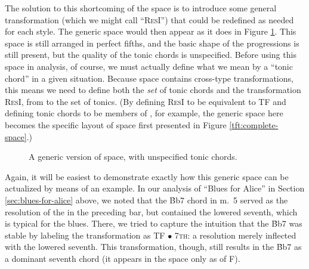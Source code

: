 The solution to this shortcoming of the space is to introduce some general
transformation (which we might call ``\textsc{ResI}'') that could be redefined
as needed for each style. The generic space would then appear as it
does in Figure \ref{tfe:generic-space}. This space is still arranged in
perfect fifths, and the basic shape of the \tfo progressions is still present,
but the quality of the tonic chords is unspecified. Before using this space in
analysis, of course, we must actually define what we mean by a ``tonic chord''
in a given situation. Because \tf space contains cross-type transformations,
this means we need to define both the \emph{set} of tonic chords and the
transformation \textsc{ResI}, from \Sdom to the set of tonics. (By defining
\textsc{ResI} to be equivalent to TF and defining tonic chords to be members
of \Smaj, for example, the generic space here becomes the specific layout of
\tf space first presented in Figure \ref{tft:complete-space}.)

\begin{figure}[tbp]
  \caption{A generic version of \tf space, with unspecified tonic chords.}
  \label{tfe:generic-space}
\end{figure}

Again, it will be easiest to demonstrate exactly how this generic space can be
actualized by means of an example. In our analysis of ``Blues for Alice'' in
Section \ref{sec:blues-for-alice} above, we noted that the \h{Bb7} chord in
m.~5 served as the resolution of the \tf in the preceding bar, but contained
the lowered seventh, which is typical for the blues. There, we tried to
capture the intuition that the \h{Bb7} was stable by labeling the
transformation as TF $\bullet$ \textsc{7th}: a resolution merely inflected with
the lowered seventh. This transformation, though, still results in the \h{Bb7}
as a dominant seventh chord (it appears in the space only as \V of F).


